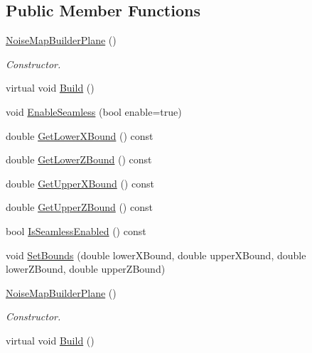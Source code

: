 \subsection*{Public Member Functions}
\begin{DoxyCompactItemize}
\item 
\hyperlink{classnoise_1_1utils_1_1_noise_map_builder_plane_ab5aac73f30890f1985603a5890c8c789}{Noise\+Map\+Builder\+Plane} ()
\begin{DoxyCompactList}\small\item\em Constructor. \end{DoxyCompactList}\item 
virtual void \hyperlink{classnoise_1_1utils_1_1_noise_map_builder_plane_a81d553c3215dc657dfe2cdbc3264a045}{Build} ()
\item 
void \hyperlink{classnoise_1_1utils_1_1_noise_map_builder_plane_aaeb5753c662ab9357ac124e06be31b22}{Enable\+Seamless} (bool enable=true)
\item 
double \hyperlink{classnoise_1_1utils_1_1_noise_map_builder_plane_a7fcdf629f25bf97dc105bd218e04e2f7}{Get\+Lower\+X\+Bound} () const 
\item 
double \hyperlink{classnoise_1_1utils_1_1_noise_map_builder_plane_accdd95d5332d919e2420ec0b6b74de3c}{Get\+Lower\+Z\+Bound} () const 
\item 
double \hyperlink{classnoise_1_1utils_1_1_noise_map_builder_plane_a676f8ad0d645990b95faa18052afd380}{Get\+Upper\+X\+Bound} () const 
\item 
double \hyperlink{classnoise_1_1utils_1_1_noise_map_builder_plane_a57893a6512748aec267e9c186d30f925}{Get\+Upper\+Z\+Bound} () const 
\item 
bool \hyperlink{classnoise_1_1utils_1_1_noise_map_builder_plane_a2ed067659249fa28e4220166cb221ce7}{Is\+Seamless\+Enabled} () const 
\item 
void \hyperlink{classnoise_1_1utils_1_1_noise_map_builder_plane_a64bae7af3e301fafe7fe887b26029d98}{Set\+Bounds} (double lower\+X\+Bound, double upper\+X\+Bound, double lower\+Z\+Bound, double upper\+Z\+Bound)
\item 
\hyperlink{classnoise_1_1utils_1_1_noise_map_builder_plane_a519a899dc1915d448046d9b19e324205}{Noise\+Map\+Builder\+Plane} ()
\begin{DoxyCompactList}\small\item\em Constructor. \end{DoxyCompactList}\item 
virtual void \hyperlink{classnoise_1_1utils_1_1_noise_map_builder_plane_a5a22db6eda87825af47cfa598d4c1fb4}{Build} ()

\end{DoxyCompactItemize}
